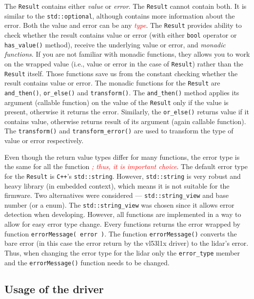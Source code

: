\documentclass[
  digital,     %
  oneside,     %
  nosansbold,  %
  nocolorbold, %
  lof,         %
  lot,         %
]{fithesis4}
\newcommand{\TODO}[1]{\textcolor{red}{\textit{#1}}}
\begin{document}
{{{The \lstinline|Result| contains either \emph{value} or \emph{error}. The \lstinline|Result| cannot contain both. It is similar to the \lstinline|std::optional|, although contains more information about the error. Both the value and error can be any \TODO{type}. The \lstinline|Result| provides ability to check whether the result contains value or error (with either \lstinline|bool| operator or \lstinline|has_value()| method), receive the underlying value or error, and \emph{monadic functions}. If you are not familiar with monadic functions, they allows you to work on the wrapped value (i.e., value or error in the case of \lstinline|Result|) rather than the \lstinline|Result| itself. Those functions save us from the constant checking whether the result contains value or error. The monadic functions for the \lstinline|Result| are \lstinline|and_then()|, \lstinline|or_else()| and \lstinline|transform()|. The \lstinline|and_then()| method applies its argument (callable function) on the value of the \lstinline|Result| only if the value is present, otherwise it returns the error. Similarly, the \lstinline|or_else()| returns value if it contains value, otherwise returns result of its argument (again callable function). The \lstinline|transform()| and \lstinline|transform_error()| are used to transform the type of value or error respectively.

Even though the return value types differ for many functions, the error type is the same for all the function \TODO{; thus, it is important choice}. The default error type for the \lstinline|Result| is \verb|C++|'s \lstinline|std::string|. However, \lstinline|std::string| is very robust and heavy library (in embedded context), which means it is not suitable for the firmware. Two alternatives were considered --- \lstinline|std::string_view| and base number (or a enum). The \lstinline|std::string_view| was chosen since it allows error detection when developing. However, all functions are implemented in a way to allow for easy error type change. Every functions returns the error wrapped by function \lstinline|errorMessage( error )|. The function \lstinline|errorMessage()| converts the bare error (in this case the error return by the \gls{vl53l1x} driver) to the \acrshort{lidar}'s error. Thus, when changing the error type for the \acrshort{lidar} only the \lstinline|error_type| member and the \lstinline|errorMessage()| function needs to be changed.

\subsection{ Usage of the driver }

}}}
\end{document}
